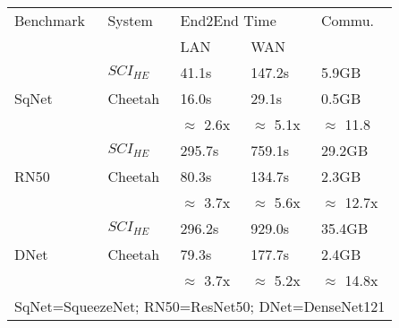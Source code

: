 \begin{tabular}{lllll}
\hline
Benchmark & System                                & \multicolumn{2}{l}{End2End Time} & Commu.          \\
          &                                       & LAN             & WAN            &                 \\ \hline
          & $\textit{SCI}_{HE}$ & 41.1s           & 147.2s         & 5.9GB           \\
SqNet     & Cheetah                               & 16.0s           & 29.1s          & 0.5GB           \\ \cline{3-5} 
          &                                       & $\approx$ 2.6x  & $\approx$ 5.1x & $\approx$ 11.8  \\ \hline
          & $\textit{SCI}_{HE}$ & 295.7s          & 759.1s         & 29.2GB          \\
RN50      & Cheetah                               & 80.3s           & 134.7s         & 2.3GB           \\ \cline{3-5} 
          &                                       & $\approx$ 3.7x  & $\approx$ 5.6x & $\approx$ 12.7x \\ \hline
          & $\textit{SCI}_{HE}$ & 296.2s          & 929.0s         & 35.4GB          \\
DNet      & Cheetah                               & 79.3s           & 177.7s         & 2.4GB           \\
          &                                       & $\approx$ 3.7x  & $\approx$ 5.2x & $\approx$ 14.8x \\
\multicolumn{5}{l}{SqNet=SqueezeNet; RN50=ResNet50; DNet=DenseNet121}
\end{tabular}